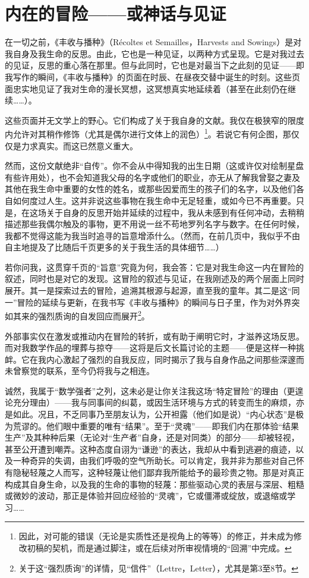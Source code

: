 \section{内在的冒险——或神话与见证}

在一切之前，《丰收与播种》（Récoltes et Semailles，Harvests and Sowings）是对我自身及我生命的反思。由此，它也是一种见证，以两种方式呈现。它是对我过去的见证，反思的重心落在那里。但与此同时，它也是对最当下之此刻的见证——即我写作的瞬间，《丰收与播种》的页面在时辰、在昼夜交替中诞生的时刻。这些页面忠实地见证了我对生命的漫长冥想，这冥想真实地延续着（甚至在此刻仍在继续……）。

这些页面并无文学上的野心。它们构成了关于我自身的文献。我仅在极狭窄的限度内允许对其稍作修饰（尤其是偶尔进行文体上的润色）\footnote{因此，对可能的错误（无论是实质性还是视角上的等等）的修正，并未成为修改初稿的契机，而是通过脚注，或在后续对所审视情境的“回溯”中完成。}。若说它有何企图，那仅仅是力求真实。而这已然意义重大。

然而，这份文献绝非“自传”。你不会从中得知我的出生日期（这或许仅对绘制星盘有些许用处），也不会知道我父母的名字或他们的职业，亦无从了解我曾娶之妻及其他在我生命中重要的女性的姓名，或那些因爱而生的孩子们的名字，以及他们各自如何度过人生。这并非说这些事物在我生命中无足轻重，或如今已不再重要。只是，在这场关于自身的反思开始并延续的过程中，我从未感到有任何冲动，去稍稍描述那些我偶尔触及的事物，更不用说一丝不苟地罗列名字与数字。在任何时候，我都不觉得这能为我当时追寻的旨意增添什么。（然而，在前几页中，我似乎不由自主地提及了比随后千页更多的关于我生活的具体细节……）

若你问我，这贯穿千页的“旨意”究竟为何，我会答：它是对我生命这一内在冒险的叙述，同时也是对它的发现。这冒险的叙述与见证，在我刚述及的两个层面上同时展开。其一是探索过去的冒险，追溯其根源与起源，直至我的童年。其二是这“同一”冒险的延续与更新，在我书写《丰收与播种》的瞬间与日子里，作为对外界突如其来的强烈质询的自发回应而展开\footnote{关于这“强烈质询”的详情，见“信件”（Lettre，Letter），尤其是第3至8节。}。

外部事实仅在激发或推动内在冒险的转折，或有助于阐明它时，才滋养这场反思。而对我数学作品的埋葬与掠夺——这将是后文长篇讨论的主题——便是这样一种挑衅。它在我内心激起了强烈的自我反应，同时揭示了我与自身作品之间那些深邃而未曾察觉的联系，至今仍将我与之相连。

诚然，我属于“数学强者”之列，这未必是让你关注我这场“特定冒险”的理由（更遑论充分理由）——我与同事间的纠葛，或因生活环境与方式的转变而生的麻烦，亦是如此。况且，不乏同事乃至朋友认为，公开袒露（他们如是说）“内心状态”是极为荒谬的。他们眼中重要的唯有“结果”。至于“灵魂”——即我们内在那体验“结果生产”及其种种后果（无论对“生产者”自身，还是对同类）的部分——却被轻视，甚至公开遭到嘲弄。这种态度自诩为“谦逊”的表达，我却从中看到逃避的痕迹，以及一种奇异的失调，由我们呼吸的空气所助长。可以肯定，我并非为那些对自己怀有隐秘轻蔑之人而写，这种轻蔑让他们鄙弃我所能给予的最珍贵之物。那是对真正构成其自身生命，以及我的生命的事物的轻蔑：那些驱动心灵的表层与深层、粗糙或微妙的波动，那正是体验并回应经验的“灵魂”，它或僵滞或绽放，或退缩或学习……

